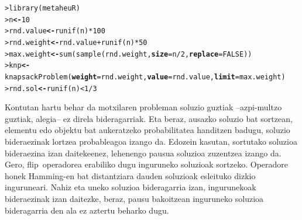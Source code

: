 \documentclass[eu]{ifirak}\usepackage[]{graphicx}\usepackage[]{color}
\makeatletter
\newcommand{\hlnum}[1]{\textcolor[rgb]{0.659,0.4,0.051}{#1}}%
\newcommand{\hlopt}[1]{\textcolor[rgb]{0,0,0}{#1}}%
\newcommand{\hlstd}[1]{\textcolor[rgb]{0,0,0}{#1}}%
\newcommand{\hlkwb}[1]{\textcolor[rgb]{0.549,0.114,0.412}{\textbf{#1}}}%
\newcommand{\hlkwc}[1]{\textcolor[rgb]{0.659,0.573,0.133}{\textbf{#1}}}%
\newcommand{\hlkwd}[1]{\textcolor[rgb]{0.659,0.133,0.482}{#1}}%
\newenvironment{kframe}{%
 \def\at@end@of@kframe{}%
 \ifinner\ifhmode%
  \def\at@end@of@kframe{\end{minipage}}%
  \begin{minipage}{\columnwidth}%
 \fi\fi%
 \def\FrameCommand##1{\hskip\@totalleftmargin \hskip-\fboxsep
 \colorbox{shadecolor}{##1}\hskip-\fboxsep
     \hskip-\linewidth \hskip-\@totalleftmargin \hskip\columnwidth}%
 \MakeFramed {\advance\hsize-\width
   \@totalleftmargin\z@ \linewidth\hsize
   \@setminipage}}%
 {\par\unskip\endMakeFramed%
 \at@end@of@kframe}
\newenvironment{knitrout}{}{} %
\newcommand{\zkk}{\guillemotleft}
\newcommand{\skk}{\guillemotright}
\makeatother
\begin{document}
\begin{knitrout}
\color{fgcolor}\begin{kframe}
\begin{alltt}
\hlstd{> }\hlkwd{library}\hlstd{(metaheuR)}
\hlstd{> }\hlstd{n} \hlkwb{<-} \hlnum{10}
\hlstd{> }\hlstd{rnd.value} \hlkwb{<-} \hlkwd{runif}\hlstd{(n)} \hlopt{*} \hlnum{100}
\hlstd{> }\hlstd{rnd.weight} \hlkwb{<-} \hlstd{rnd.value} \hlopt{+} \hlkwd{runif}\hlstd{(n)} \hlopt{*} \hlnum{50}
\hlstd{> }\hlstd{max.weight} \hlkwb{<-} \hlkwd{sum}\hlstd{(}\hlkwd{sample}\hlstd{(rnd.weight,} \hlkwc{size}\hlstd{=n} \hlopt{/} \hlnum{2}\hlstd{,} \hlkwc{replace}\hlstd{=}\hlnum{FALSE}\hlstd{))}
\hlstd{> }\hlstd{knp} \hlkwb{<-} \hlkwd{knapsackProblem}\hlstd{(}\hlkwc{weight}\hlstd{=rnd.weight,} \hlkwc{value}\hlstd{=rnd.value,} \hlkwc{limit}\hlstd{=max.weight)}
\hlstd{> }\hlstd{rnd.sol} \hlkwb{<-} \hlkwd{runif}\hlstd{(n)} \hlopt{<} \hlnum{1} \hlopt{/} \hlnum{3}
\end{alltt}
\end{kframe}
\end{knitrout}

Kontutan hartu behar da motxilaren probleman soluzio guztiak --azpi-multzo guztiak, alegia-- ez direla bideragarriak. Eta beraz, ausazko soluzio bat sortzean, elementu edo objektu bat aukeratzeko probabilitatea handitzen badugu, soluzio bideraezinak lortzea probableagoa izango da. Edozein kasutan, sortutako soluzioa bideraezina izan daitekeenez, lehenengo pausua soluzioa zuzentzea izango da. Gero, \zkk flip\skk\ operadorea erabiliko dugu inguruneko soluzioak sortzeko. Operadore honek Hamming-en bat distantziara dauden soluzioak esleituko dizkio inguruneari. Nahiz eta uneko soluzioa bideragarria izan, ingurunekoak bideraezinak izan daitezke, beraz, pausu bakoitzean inguruneko soluzioa bideragarria den ala ez aztertu beharko dugu. 
\end{document}
